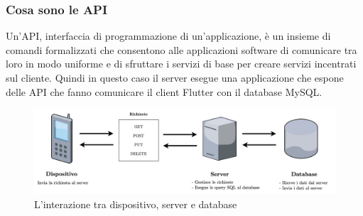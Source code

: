\subsubsection{Cosa sono le API}
Un'API, interfaccia di programmazione di un’applicazione, è un insieme di comandi formalizzati che consentono alle applicazioni software di comunicare tra loro in modo uniforme e di sfruttare i servizi di base per creare servizi incentrati sul cliente. Quindi in questo caso il server esegue una applicazione che espone delle API che fanno comunicare il client Flutter con il database MySQL. 

\begin{center}
\begin{figure}[htp]
    \centering
    \includegraphics[width=12cm]{diagrams/diagramma_backend.png}
    \caption{L'interazione tra dispositivo, server e database}
    \label{fig:interazione_backend}
\end{figure}
\end{center}


